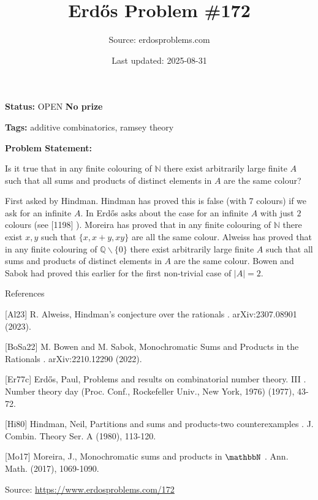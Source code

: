 \documentclass{article}
\title{Erd\H{o}s Problem \#172}
\date{Last updated: 2025-08-31}
\author{Source: erdosproblems.com}
\begin{document}
\maketitle

\noindent\textbf{Status:} OPEN \quad \textbf{No prize}

\noindent\textbf{Tags:} additive combinatorics, ramsey theory

\medskip

\noindent\textbf{Problem Statement:}

Is it true that in any finite colouring of $\mathbb{N}$ there exist arbitrarily large finite $A$ such that all sums and products of distinct elements in $A$ are the same colour?




First asked by Hindman. Hindman \cite{Hi80} has proved this is false (with 7 colours) if we ask for an infinite $A$. In \cite{Er77c} Erd\H{o}s asks about the case for an infinite $A$ with just $2$ colours (see [1198] ). Moreira \cite{Mo17} has proved that in any finite colouring of $\mathbb{N}$ there exist $x,y$ such that $\{x,x+y,xy\}$ are all the same colour. Alweiss \cite{Al23} has proved that in any finite colouring of $\mathbb{Q}\backslash \{0\}$ there exist arbitrarily large finite $A$ such that all sums and products of distinct elements in $A$ are the same colour. Bowen and Sabok \cite{BoSa22} had proved this earlier for the first non-trivial case of $\lvert A\rvert=2$.




References

[Al23] R. Alweiss, Hindman's conjecture over the rationals . arXiv:2307.08901 (2023).

[BoSa22] M. Bowen and M. Sabok, Monochromatic Sums and Products in the Rationals . arXiv:2210.12290 (2022).

[Er77c] Erd\H{o}s, Paul, Problems and results on combinatorial number theory. III . Number theory day (Proc. Conf., Rockefeller Univ., New York, 1976) (1977), 43-72.

[Hi80] Hindman, Neil, Partitions and sums and products-two counterexamples . J. Combin. Theory Ser. A (1980), 113-120.

[Mo17] Moreira, J., Monochromatic sums and products in $\mathbbN$ . Ann. Math. (2017), 1069-1090.


\bigskip
\noindent\small{Source: \url{https://www.erdosproblems.com/172}}
\end{document}
